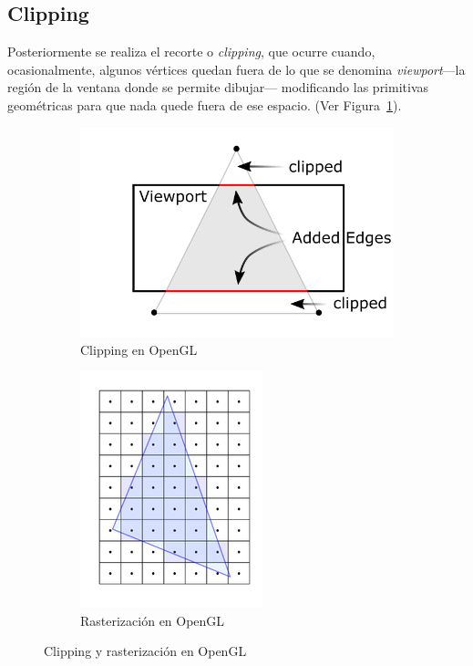 \subsection{Clipping}
\label{ref:clipping}

Posteriormente se realiza el recorte o \textit{clipping}, que ocurre cuando,
ocasionalmente, algunos vértices quedan fuera de lo que se denomina
\textit{viewport}---la región de la ventana donde se permite dibujar---
modificando las primitivas geométricas para que nada quede fuera de ese espacio.
(Ver Figura~\ref{fig2.3a}).\\

\begin{figure}[h]
	\begin{subfigure}[b]{0.5\textwidth}
		\centering 
		\includegraphics{figures/clipping.png}
		\caption{Clipping en OpenGL}
		\label{fig2.3a}
	\end{subfigure}
	\begin{subfigure}[b]{0.5\textwidth}
		\centering 
		\includegraphics{figures/rasterization.png}
		\caption{Rasterización en OpenGL}
		\label{fig2.3b}
	\end{subfigure}
	\caption{Clipping y rasterización en OpenGL}
	\label{fig2.3}
\end{figure}

